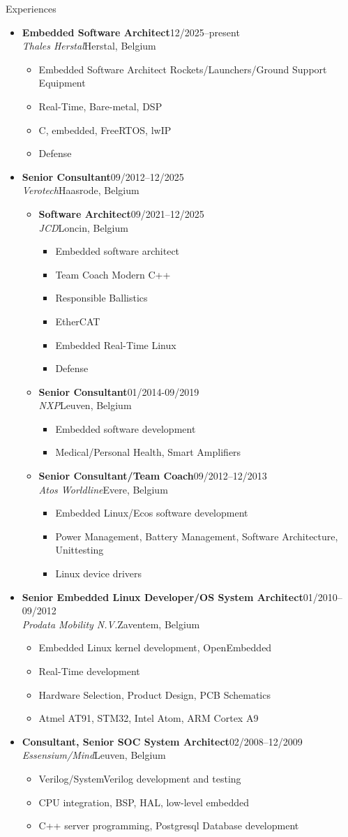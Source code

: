 \documentclass[12pt,oneside]{article}
\newenvironment{ressection}[1]{
	\vspace{5pt}
	{\selectfont\Large#1}
	\begin{itemize}
	\vspace{5pt}
}{
	\end{itemize}
}
\newcommand{\ressubitem}[1]{
	\vspace{-4pt}
	\item \begin{flushleft} #1 \end{flushleft}
}
\newcommand{\resbigitem}[4]{
	\vspace{-5pt}
	\item
	\textbf{#1}\hfill#4 \\
	\textit{#2}\hfill#3
}
\newenvironment{ressubsec}[4]{
	\resbigitem{#1}{#2}{#3}{#4}
	\vspace{-2pt}
	\begin{itemize}
}{
	\end{itemize}
}
\newenvironment{ressubsubsec}[4]{
	\vspace{5pt}
	\resbigitem{#1}{#2}{#3}{#4}
	\begin{itemize}
}{
	\end{itemize}
}
\newcommand{\ressubsubitem}[1]{
	\vspace{-1pt}
	\item \begin{flushleft} #1 \end{flushleft}
}
\begin{document}
\begin{ressection}{Experiences}
	\begin{ressubsec}{Embedded Software Architect}{Thales Herstal}{Herstal, Belgium}{12/2025--present}
		\ressubitem{Embedded Software Architect Rockets/Launchers/Ground Support Equipment}
		\ressubitem{Real-Time, Bare-metal, DSP}
		\ressubitem{C, embedded, FreeRTOS, lwIP}
		\ressubitem{Defense}
	\end{ressubsec}
	\begin{ressubsec}{Senior Consultant}{Verotech}{Haasrode, Belgium}{09/2012--12/2025}
        \begin{ressubsubsec}{Software Architect}{JCD}{Loncin, Belgium}{09/2021--12/2025}
            \ressubsubitem{Embedded software architect}
            \ressubsubitem{Team Coach Modern C++}
            \ressubsubitem{Responsible Ballistics}
            \ressubsubitem{EtherCAT}
            \ressubsubitem{Embedded Real-Time Linux}
            \ressubsubitem{Defense}
        \end{ressubsubsec}
		\begin{ressubsubsec}{Senior Consultant}{NXP}{Leuven, Belgium}{01/2014-09/2019}
			\ressubsubitem{Embedded software development}
			\ressubsubitem{Medical/Personal Health, Smart Amplifiers}
		\end{ressubsubsec}
		\begin{ressubsubsec}{Senior Consultant/Team Coach}{Atos Worldline}{Evere, Belgium}{09/2012--12/2013}
			\ressubsubitem{Embedded Linux/Ecos software development}
			\ressubsubitem{Power Management, Battery Management, Software Architecture, Unittesting}
			\ressubsubitem{Linux device drivers}
		\end{ressubsubsec}
	\end{ressubsec}
	\begin{ressubsec}{Senior Embedded Linux Developer/OS System Architect}{Prodata Mobility N.V.}{Zaventem, Belgium}{01/2010--09/2012}
		\ressubsubitem{Embedded Linux kernel development, OpenEmbedded}
		\ressubsubitem{Real-Time development}
		\ressubsubitem{Hardware Selection, Product Design, PCB Schematics}
		\ressubsubitem{Atmel AT91, STM32, Intel Atom, ARM Cortex A9}
	\end{ressubsec}
	\begin{ressubsec}{Consultant, Senior SOC System Architect}{Essensium/Mind}{Leuven, Belgium}{02/2008--12/2009}
		\ressubitem{Verilog/SystemVerilog development and testing}
		\ressubitem{CPU integration, BSP, HAL, low-level embedded}
		\ressubitem{C++ server programming, Postgresql Database development}

\end{ressubsec}
\end{ressection}
\end{document}
